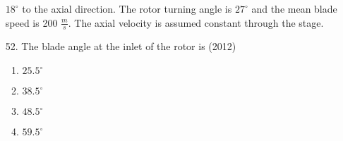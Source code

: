 \documentclass[journal]{IEEEtran}
\begin{document}
\begin{enumerate}
$18^{\circ}$ to the axial direction. The rotor turning angle is $27^{\circ}$ and the mean blade speed is 200 $\frac{m}{s}$. The axial
velocity is assumed constant through the stage.
    \item[52.] The blade angle at the inlet of the rotor is \hfill (2012)
    \begin{enumerate}[label=(\Alph*)]
        \item $25.5^{\circ}$ 
        \item $38.5^{\circ}$ 
        \item $48.5^{\circ}$ 
        \item $59.5^{\circ}$ 
    \end{enumerate} 
\end{enumerate}
\end{document}
